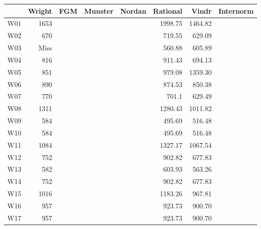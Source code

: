 \begin{tabular}{|p{4cm}||r|r|r|r|r|r|r|}
\hline
            &Wright     &FGM       &Munster &Nordan  &Rational   &Vindr  &Internorm         
\\ \hline
W01         &1653       &          &        &        &1998.75    &1464.82&                        
\\ \hline
W02         &670        &          &        &        &719.55     &629.09 &                            
\\ \hline
W03         &Miss       &          &        &        &560.88     &605.89 &                            
\\ \hline
W04         &816        &          &        &        &911.43     &694.13 &                     
\\ \hline
W05         &851        &          &        &        &979.08     &1359.30&                    
\\ \hline
W06         &890        &          &        &        &874.53     &850.38 &                    
\\ \hline
W07         &770        &          &        &        &701.1      &629.49 &                    
\\ \hline
W08         &1311       &          &        &        &1280.43    &1011.82&                     
\\ \hline
W09         &584        &          &        &        &495.69     &516.48 &                    
\\ \hline
W10         &584        &          &        &        &495.69     &516.48 &                     
\\ \hline
W11         &1084       &          &        &        &1327.17    &1067.54&                     
\\ \hline
W12         &752        &          &        &        &902.82     &677.83 &               
\\ \hline
W13         &582        &          &        &        &603.93     &563.26 &                   
\\ \hline
W14         &752        &          &        &        &902.82     &677.83 &                    
\\ \hline
W15         &1016       &          &        &        &1183.26    &967.81 &                     
\\ \hline
W16         &957        &          &        &        &923.73     &900.70 &                    
\\ \hline
W17         &957        &          &        &        &923.73     &900.70 &                    

\end{tabular}
